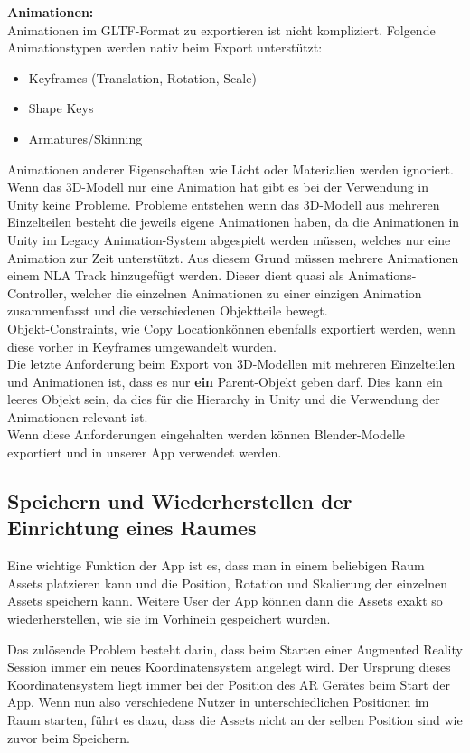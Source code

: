 \documentclass[titlepage, a4paper, 11pt]{scrartcl}
\begin{document}
  \textbf{Animationen:}\\
  Animationen im GLTF-Format zu exportieren ist nicht kompliziert. Folgende Animationstypen werden nativ beim Export unterstützt:
  \begin{itemize}
  \item Keyframes (Translation, Rotation, Scale)
  \item Shape Keys
  \item Armatures/Skinning
  \end{itemize}
  Animationen anderer Eigenschaften wie Licht oder Materialien werden ignoriert.\\
  Wenn das 3D-Modell nur eine Animation hat gibt es bei der Verwendung in Unity keine Probleme. Probleme entstehen wenn das 3D-Modell aus mehreren Einzelteilen besteht die jeweils eigene Animationen haben, da die Animationen in Unity im Legacy Animation-System abgespielt werden müssen, welches nur eine Animation zur Zeit unterstützt. Aus diesem Grund müssen mehrere Animationen einem NLA Track hinzugefügt werden. Dieser dient quasi als Animations-Controller, welcher die einzelnen Animationen zu einer einzigen Animation zusammenfasst und die verschiedenen Objektteile bewegt.\\
  Objekt-Constraints, wie \glqq Copy Location\grqq können ebenfalls exportiert werden, wenn diese vorher in Keyframes umgewandelt wurden.\\
  Die letzte Anforderung beim Export von 3D-Modellen mit mehreren Einzelteilen und Animationen ist, dass es nur \textbf{ein} Parent-Objekt geben darf. Dies kann ein leeres Objekt sein, da dies für die Hierarchy in Unity und die Verwendung der Animationen relevant ist.\\

  Wenn diese Anforderungen eingehalten werden können Blender-Modelle exportiert und in unserer App verwendet werden.

  \subsection{Speichern und Wiederherstellen der Einrichtung eines Raumes}

  Eine wichtige Funktion der App ist es, dass man in einem beliebigen Raum Assets platzieren kann und die Position, Rotation und Skalierung der einzelnen Assets speichern kann.
  Weitere User der App können dann die Assets exakt so wiederherstellen, wie sie im Vorhinein gespeichert wurden.

  Das zulösende Problem besteht darin, dass beim Starten einer Augmented Reality Session immer ein neues Koordinatensystem angelegt wird.
  Der Ursprung dieses Koordinatensystem liegt immer bei der Position des AR Gerätes beim Start der App.
  Wenn nun also verschiedene Nutzer in unterschiedlichen Positionen im Raum starten, führt es dazu, dass die Assets nicht an der selben Position sind wie zuvor beim Speichern.
  
\end{document}
